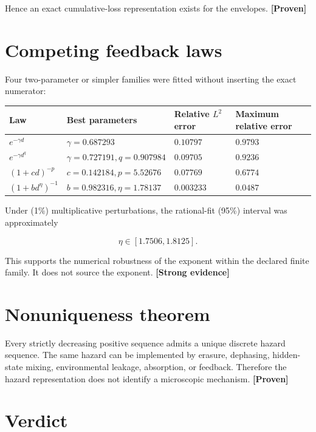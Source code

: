 \documentclass[11pt,a4paper,openany]{report}
\newcommand{\statusProven}{\textcolor{fingreen}{[Proven]}}
\newcommand{\statusStrong}{\textcolor{finblue}{[Strong evidence]}}
\begin{document}
Hence an exact cumulative-loss representation exists for the envelopes. \textbf{\statusProven{}}

\section{Competing feedback laws}

Four two-parameter or simpler families were fitted without inserting the exact numerator:

\begin{center}
\begingroup\small
\setlength{\tabcolsep}{3.5pt}
\renewcommand{\arraystretch}{1.16}
\begin{longtable}{@{}p{}p{}p{}p{}@{}}
\toprule
\textbf{Law} & \textbf{Best parameters} & \textbf{Relative \(L^2\) error} & \textbf{Maximum relative error} \\
\midrule
\endhead
\(e^{-\gamma d}\) & \(\gamma=0.687293\) & \(0.10797\) & \(0.9793\) \\
\(e^{-\gamma d^q}\) & \(\gamma=0.727191,q=0.907984\) & \(0.09705\) & \(0.9236\) \\
\((1+cd)^{-p}\) & \(c=0.142184,p=5.52676\) & \(0.07769\) & \(0.6774\) \\
\((1+bd^\eta)^{-1}\) & \(b=0.982316,\eta=1.78137\) & \(0.003233\) & \(0.0487\) \\
\bottomrule
\end{longtable}
\endgroup
\end{center}

Under (1\%) multiplicative perturbations, the rational-fit (95\%) interval was approximately

\[
\eta\in[1.7506,1.8125].
\]

This supports the numerical robustness of the exponent within the declared finite family. It does not source the exponent. \textbf{\statusStrong{}}

\section{Nonuniqueness theorem}

Every strictly decreasing positive sequence admits a unique discrete hazard sequence. The same hazard can be implemented by erasure, dephasing, hidden-state mixing, environmental leakage, absorption, or feedback. Therefore the hazard representation does not identify a microscopic mechanism. \textbf{\statusProven{}}

\section{Verdict}
\end{document}

